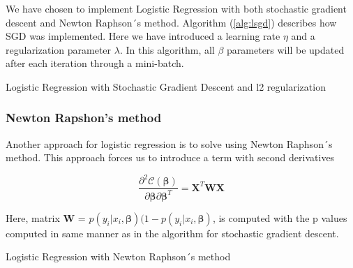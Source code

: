 \documentclass
[twocolumn,
secnumarabic,
nobibnotes,
aps,
prl,
reprint,
groupedaddress,
amsmath,
amssymb
]{revtex4-2}
\begin{document}
We have chosen to implement Logistic Regression with both stochastic gradient descent and Newton Raphson´s method. Algorithm (\ref{alg:lsgd}) describes how SGD was implemented. Here we have introduced a learning rate $\eta$ and a regularization parameter $\lambda$. In this algorithm, all $\beta$ parameters will be updated after each iteration through a mini-batch.

\begin{algorithm}
  \Return{$\theta$}
  \caption{\label{alg:lsgd}Logistic Regression with Stochastic Gradient Descent and l2 regularization}
\end{algorithm}

\subsubsection{Newton Rapshon's method}

Another approach for logistic regression is to solve using Newton Raphson´s method. This approach forces us to introduce a term with second derivatives

\begin{equation}
  \nonumber
  \frac{\partial^2 \mathcal{C}(\boldsymbol{\beta})}{\partial \boldsymbol{\beta}\partial \boldsymbol{\beta}^T} = \boldsymbol{X}^T\boldsymbol{W}\boldsymbol{X}
\end{equation}

Here, matrix $\boldsymbol{W}$ = $p(y_i\vert x_i,\boldsymbol{\beta})(1-p(y_i\vert x_i,\boldsymbol{\beta})$, is computed with the p values computed in same manner as in the algorithm for stochastic gradient descent.

\begin{algorithm}
  \Return{$\theta$}
  \caption{\label{alg:newtonraphson}Logistic Regression with Newton Raphson´s method}
\end{algorithm}
\end{document}
